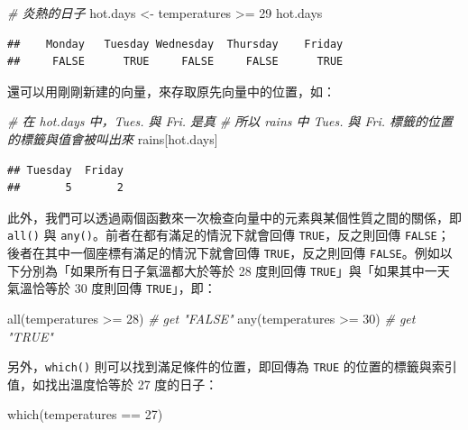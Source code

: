 \documentclass[
]{book}
\newenvironment{Shaded}{\begin{snugshade}}{\end{snugshade}}
\newcommand{\CommentTok}[1]{\textcolor[rgb]{0.56,0.35,0.01}{\textit{#1}}}
\newcommand{\DecValTok}[1]{\textcolor[rgb]{0.00,0.00,0.81}{#1}}
\newcommand{\FunctionTok}[1]{\textcolor[rgb]{0.00,0.00,0.00}{#1}}
\newcommand{\NormalTok}[1]{#1}
\newcommand{\OtherTok}[1]{\textcolor[rgb]{0.56,0.35,0.01}{#1}}
\newcommand{\SpecialCharTok}[1]{\textcolor[rgb]{0.00,0.00,0.00}{#1}}
\theoremstyle{definition}
\theoremstyle{remark}
\begin{document}
\begin{Shaded}
\begin{Highlighting}[]
\CommentTok{\# 炎熱的日子}
\NormalTok{hot.days }\OtherTok{\textless{}{-}}\NormalTok{ temperatures }\SpecialCharTok{\textgreater{}=} \DecValTok{29}
\NormalTok{hot.days}
\end{Highlighting}
\end{Shaded}

\begin{verbatim}
##    Monday   Tuesday Wednesday  Thursday    Friday 
##     FALSE      TRUE     FALSE     FALSE      TRUE
\end{verbatim}

還可以用剛剛新建的向量，來存取原先向量中的位置，如：

\begin{Shaded}
\begin{Highlighting}[]
\CommentTok{\# 在 hot.days 中，Tues. 與 Fri. 是真}
\CommentTok{\# 所以 rains 中 Tues. 與 Fri. 標籤的位置的標籤與值會被叫出來}
\NormalTok{rains[hot.days]}
\end{Highlighting}
\end{Shaded}

\begin{verbatim}
## Tuesday  Friday 
##       5       2
\end{verbatim}

此外，我們可以透過兩個函數來一次檢查向量中的元素與某個性質之間的關係，即 \texttt{all()} 與 \texttt{any()}。前者在都有滿足的情況下就會回傳 \texttt{TRUE}，反之則回傳 \texttt{FALSE}；後者在其中一個座標有滿足的情況下就會回傳 \texttt{TRUE}，反之則回傳 \texttt{FALSE}。例如以下分別為「如果所有日子氣溫都大於等於 28 度則回傳 \texttt{TRUE}」與「如果其中一天氣溫恰等於 30 度則回傳 \texttt{TRUE}」，即：

\begin{Shaded}
\begin{Highlighting}[]
\FunctionTok{all}\NormalTok{(temperatures }\SpecialCharTok{\textgreater{}=} \DecValTok{28}\NormalTok{)  }\CommentTok{\# get "FALSE"}
\FunctionTok{any}\NormalTok{(temperatures }\SpecialCharTok{\textgreater{}=} \DecValTok{30}\NormalTok{)  }\CommentTok{\# get "TRUE"}
\end{Highlighting}
\end{Shaded}

另外，\texttt{which()} 則可以找到滿足條件的位置，即回傳為 \texttt{TRUE} 的位置的標籤與索引值，如找出溫度恰等於 27 度的日子：

\begin{Shaded}
\begin{Highlighting}[]
\FunctionTok{which}\NormalTok{(temperatures }\SpecialCharTok{==} \DecValTok{27}\NormalTok{)}
\end{Highlighting}
\end{Shaded}
\end{document}
